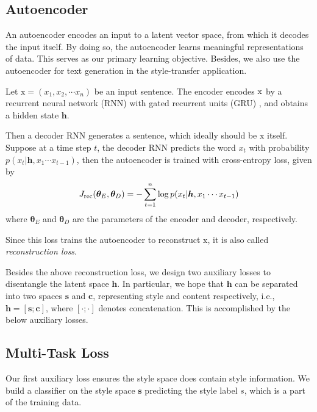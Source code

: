 \documentclass[11pt,a4paper]{article}
\newcommand{\rmx}{\mathrm x}
\begin{document}
\subsection{Autoencoder}\label{ss:seq2seq}

An autoencoder encodes an input to a latent vector space, from which it decodes the input itself. By doing so, the autoencoder learns meaningful representations of data. This serves as our primary learning objective. Besides, we also use the autoencoder for text generation in the style-transfer application.

Let $\rmx=(x_1, x_2, \cdots x_n)$ be an input sentence. The encoder encodes $\rm x$ by a recurrent neural network (RNN) with gated recurrent units (GRU) \cite{cho2014learning}, and obtains a hidden state $\bm h$.

Then a decoder RNN generates a sentence, which ideally should be $\rmx$ itself. Suppose at a time step $t$, the decoder RNN predicts the word $x_t$ with probability $p(x_t|\bm h, x_1\cdots x_{t-1})$, then the autoencoder is trained with cross-entropy loss, given by
\vspace{-.5cm}
\begin{equation}\nonumber
	J_\text{rec}(\bm\theta_E,\bm\theta_D)= -\sum_{t=1}^n \log
	p(x_t|\bm h, x_1\cdots x_{t-1})
	\vspace{-.3cm}
\end{equation}
where $\bm\theta_E$ and $\bm\theta_D$ are the parameters of the encoder and decoder, respectively.

Since this loss trains the autoencoder to reconstruct $\rmx$, it is also called \textit{reconstruction loss}.

Besides the above reconstruction loss, we design two auxiliary losses to disentangle the latent space $\bm h$. In particular, we hope that $\bm h$ can be separated into two spaces $\bm s$ and $\bm c$, representing style and content respectively, i.e., $\bm h = [\bm s ; \bm c]$, where $[\cdot;\cdot]$ denotes concatenation. This is accomplished by the below auxiliary losses.

\subsection{Multi-Task Loss} \label{ss:multi}

Our first auxiliary loss ensures the style space does contain style information. We build a classifier on the style space $\bm s$ predicting the style label $s$, which is a part of the training data.
\end{document}
